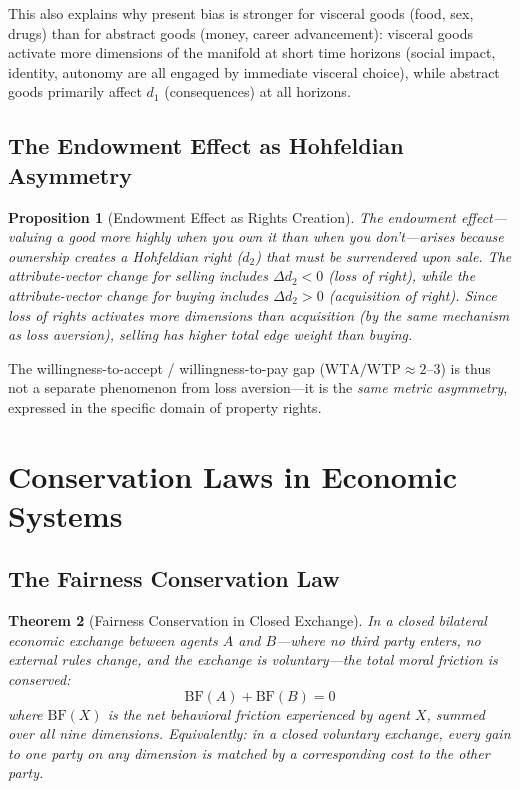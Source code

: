 \documentclass[12pt]{article}
\newtheorem{theorem}{Theorem}[section]
\newtheorem{proposition}[theorem]{Proposition}
\theoremstyle{definition}
\theoremstyle{remark}
\newcommand{\BF}{\mathrm{BF}}              %
\begin{document}
This also explains why present bias is stronger for visceral goods (food, sex, drugs) than for abstract goods (money, career advancement): visceral goods activate more dimensions of the manifold at short time horizons (social impact, identity, autonomy are all engaged by immediate visceral choice), while abstract goods primarily affect $d_1$ (consequences) at all horizons.

\subsection{The Endowment Effect as Hohfeldian Asymmetry}

\begin{proposition}[Endowment Effect as Rights Creation]
\label{prop:endowment}
The endowment effect---valuing a good more highly when you own it than when you don't---arises because ownership creates a Hohfeldian right ($d_2$) that must be \emph{surrendered} upon sale.  The attribute-vector change for selling includes $\Delta d_2 < 0$ (loss of right), while the attribute-vector change for buying includes $\Delta d_2 > 0$ (acquisition of right).  Since loss of rights activates more dimensions than acquisition (by the same mechanism as loss aversion), selling has higher total edge weight than buying.
\end{proposition}

The willingness-to-accept / willingness-to-pay gap ($\text{WTA} / \text{WTP} \approx 2$--$3$) is thus not a separate phenomenon from loss aversion---it is the \emph{same metric asymmetry}, expressed in the specific domain of property rights.


\section{Conservation Laws in Economic Systems}
\label{sec:conservation}

\subsection{The Fairness Conservation Law}

\begin{theorem}[Fairness Conservation in Closed Exchange]
\label{thm:fairness_conservation}
In a closed bilateral economic exchange between agents $A$ and $B$---where no third party enters, no external rules change, and the exchange is voluntary---the total \emph{moral friction} is conserved:
\begin{equation}
\BF(A) + \BF(B) = 0
\label{eq:fairness_conservation}
\end{equation}
where $\BF(X)$ is the net behavioral friction experienced by agent $X$, summed over all nine dimensions.  Equivalently: in a closed voluntary exchange, every gain to one party on any dimension is matched by a corresponding cost to the other party.
\end{theorem}
\end{document}
